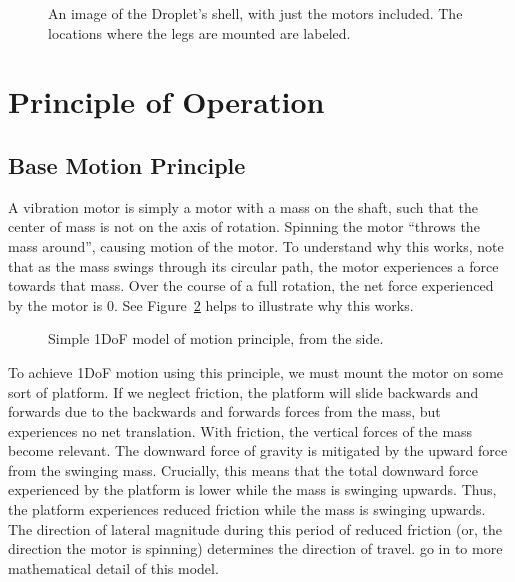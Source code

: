 \documentclass[letterpaper, 10pt, conference]{ieeeconf}
\begin{document}
\begin{figure}[h]
	\centering
	
	\caption{An image of the Droplet's shell, with just the motors included. The locations where the legs are mounted are labeled.}
	\label{motorLocations}
\end{figure}



\section{Principle of Operation}

\subsection{Base Motion Principle}
A vibration motor is simply a motor with a mass on the shaft, such that the center of mass is not on the axis of rotation. Spinning the motor ``throws the mass around'', causing motion of the motor. To understand why this works, note that as the mass swings through its circular path, the motor experiences a force towards that mass. Over the course of a full rotation, the net force experienced by the motor is 0. See Figure~\ref{motorDiagram} helps to illustrate why this works.

\begin{figure}
\centering

\caption{Simple 1DoF model of motion principle, from the side.}
\label{motorDiagram}
\end{figure}

To achieve 1DoF motion using this principle, we must mount the motor on some sort of platform. If we neglect friction, the platform will slide backwards and forwards due to the backwards and forwards forces from the mass, but experiences no net translation. With friction, the vertical forces of the mass become relevant. The downward force of gravity is mitigated by the upward force from the swinging mass. Crucially, this means that the total downward force experienced by the platform is lower while the mass is swinging upwards. Thus, the platform experiences reduced friction while the mass is swinging upwards. The direction of lateral magnitude during this period of reduced friction (or, the direction the motor is spinning) determines the direction of travel. \cite{Vartholomeos2005,Vartholomeos2006} go in to more mathematical detail of this model.
\end{document}

